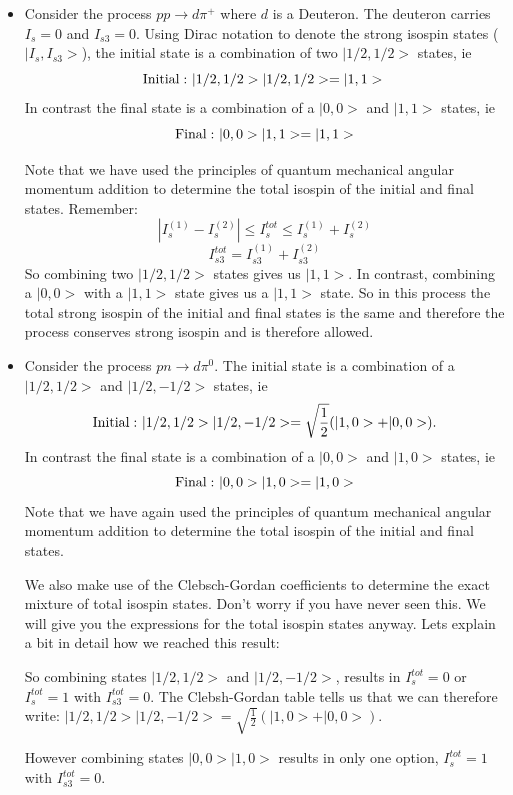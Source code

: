 \begin{itemize}
\item Consider the process $pp\to d\pi^+$ where $d$ is a Deuteron. The deuteron carries $I_s=0$ and $I_{s3}=0$. Using Dirac notation to denote the strong isospin states ($|I_s,I_{s3}>$), the initial state is a combination of two $|1/2,1/2>$ states, ie
\[
{\rm Initial:}~|1/2,1/2>|1/2,1/2>=|1,1>\\
\]
In contrast the final state is a combination of a $|0,0>$ and $|1,1>$ states, ie
\[
{\rm Final:}~|0,0>|1,1>=|1,1>
\]

Note that we have used the principles of quantum mechanical angular momentum addition to determine the total isospin of the initial and final states. Remember: 
\[
|I_{s}^{(1)}-I_{s}^{(2)}|\leq I_{s}^{tot}\leq I_{s}^{(1)}+I_{s}^{(2)}
\]
\[
I_{s3}^{tot}=I_{s3}^{(1)}+I_{s3}^{(2)}
\]
So combining two $|1/2,1/2>$ states gives us $|1,1>$. In contrast, combining a $|0,0>$ with a $|1,1>$ state gives us a $|1,1>$ state. So in this process the total strong isospin of the initial and final states is the same and therefore the process conserves strong isospin and is therefore allowed.

\item Consider the process $pn\to d\pi^0$. The initial state is a combination of a $|1/2,1/2>$ and $|1/2,-1/2>$ states, ie
\[
{\rm Initial:}~|1/2,1/2>|1/2,-1/2>=\sqrt{\frac{1}{2}}(|1,0>+|0,0>).\\
\]
In contrast the final state is a combination of a $|0,0>$ and $|1,0>$ states, ie
\[
{\rm Final:}~|0,0>|1,0>=|1,0>
\]
Note that we have again used the principles of quantum mechanical angular momentum addition
to determine the total isospin of the initial and final states.

We also make use of the Clebsch-Gordan coefficients to determine the exact mixture
of total isospin states. Don't worry if you have never seen this. We will give
you the expressions for the total isospin states anyway. Lets explain a bit in detail how we reached this result:

So combining  states $|1/2,1/2>$ and $|1/2,-1/2>$, 
results in $I_{s}^{tot}=0$ or $I_{s}^{tot}=1$ with $I_{s3}^{tot}=0$. The Clebsh-Gordan table tells us that we can therefore write: $|1/2,1/2>|1/2,-1/2>=\sqrt{\frac{1}{2}}(|1,0>+|0,0>)$.

However combining states $|0,0>|1,0>$ results in only one option, $I_{s}^{tot}=1$ with $I_{s3}^{tot}=0$.


\end{itemize}
